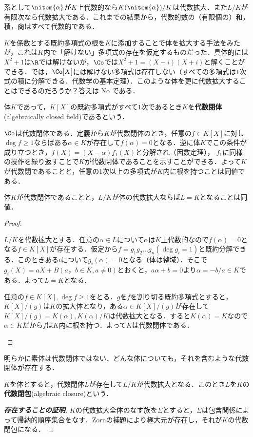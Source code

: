 系として$\nitem{\alpha}$が$K$上代数的なら$K(\nitem{\alpha})/K$は代数拡大．また$L/K$が有限次なら代数拡大である．これまでの結果から，代数的数の（有限個の）和，積，商はすべて代数的である．

$K$を係数とする既約多項式の根を$K$に添加することで体を拡大する手法をみたが，これは$K$内で「解けない」多項式の存在を仮定するものだった．具体的には$X^2+1$は$\R$では解けないが，$\Co$では$X^2+1=(X-i)(X+i)$と解くことができる．では，$\Co[X]$には解けない多項式は存在しない（すべての多項式は$1$次式の積に分解できる．代数学の基本定理）．このような体を更に代数拡大することはできるのだろうか？答えは No である．

\begin{defi}[代数閉体]
	体$K$であって，$K[X]$の既約多項式がすべて$1$次であるとき$K$を\textbf{代数閉体}(algebraically closed field)であるという．
\end{defi}

$\Co$は代数閉体である．定義から$K$が代数閉体のとき，任意の$f\in K[X]$に対し$\deg f\geq1$ならばある$\alpha\in K$が存在して$f(\alpha)=0$となる．逆に体$K$でこの条件が成り立つとき，$f(X)=(X-\alpha)f_1(X)$と分解され（因数定理）， $f_1$に同様の操作を繰り返すことで$K$が代数閉体であることを示すことができる．よって$K$が代数閉であることと，任意の$1$次以上の多項式が$K$内に根を持つことは同値である．

\begin{prop}
	体$K$が代数閉体であることと，$L/K$が体の代数拡大ならば$L=K$となることは同値．
\end{prop}

\begin{proof}
	\begin{eqv}
		\item $L/K$を代数拡大とする．任意の$\alpha\in L$について$\alpha$は$K$上代数的なので$f(\alpha)=0$となる$f\in K[X]$が存在する．仮定から$f=g_1g_2\dots g_n (\deg g_i=1)$と既約分解できる．このときある$i$について$g_i(\alpha)=0$となる（体は整域）．そこで$g_i(X)=aX+B (a，b\in K, a\neq0)$とおくと，$a\alpha+b=0$より$\alpha=-b/a\in K$である．よって$L=K$となる．
	
	\item 任意の$f\in K[X],\deg f\geq1$をとる．$g$を$f$を割り切る既約多項式とすると，$K[X]/(g)$は$K$の拡大体となり，ある$\alpha\in K[X]/(g)$が存在して$K[X]/(g)=K(\alpha),K(\alpha)/K$は代数拡大となる．すると$K(\alpha)=K$なので$\alpha\in K$だから$f$は$K$内に根を持つ．よって$K$は代数閉体である．
	\end{eqv}
\end{proof}

明らかに素体は代数閉体ではない．どんな体についても，それを含むような代数閉体が存在する．

\begin{defi}[代数閉包]
	$K$を体とすると，代数閉体$L$が存在して$L/K$が代数拡大となる．このとき$L$を$K$の\textbf{代数閉包}(algebraic closure)という．
\end{defi}

\begin{proof}[\textbf{存在することの証明}]
	$K$の代数拡大全体のなす族を$\Sigma$とすると，$\Sigma$は包含関係によって帰納的順序集合をなす．Zornの補題により極大元が存在し，それが$K$の代数閉包になる．
\end{proof}